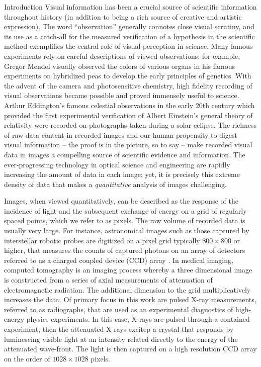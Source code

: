 \setlength{\parindent}{2ex}
\begin{chapter}{Introduction}\label{chapter:introduction}
  Visual information has been a crucial source of scientific information throughout history (in addition to being a rich source of creative and artistic expression).  
  The word ``observation'' generally connotes close visual scrutiny, and its use as a catch-all for the measured verification of a hypothesis in the scientific method exemplifies the central role of visual perception in science.
  Many famous experiments rely on careful descriptions of viewed observations; for example, Gregor Mendel visually observed the colors of various organs in his famous experiments on hybridized peas to develop the early principles of genetics.
  With the advent of the camera and photosensitive chemistry, high fidelity recording of visual observations became possible and proved immensely useful to science.
  Arthur Eddington's famous celestial observations in the early 20th century which provided the first experimental verification of Albert Einstein's general theory of relativity were recorded on photographs taken during a solar eclipse.
  The richness of raw data content in recorded images and our human propensity to digest visual information -- the proof is in the picture, so to say -- make recorded visual data in images a compelling source of scientific evidence and information.
  The ever-progressing technology in optical science and engineering are rapidly increasing the amount of data in each image; yet, it is precisely this extreme density of data that makes a \emph{quantitative} analysis of images challenging.

  Images, when viewed quantitatively, can be described as the response of the incidence of light and the subsequent exchange of energy on a grid of regularly spaced points, which we refer to as pixels.
  The raw volume of recorded data is usually very large.
  For instance, astronomical images such as those captured by interstellar robotic probes are digitized on a pixel grid typically $800 \times 800$ or higher, that measures the counts of captured photons on an array of detectors referred to as a charged coupled device (CCD) array \citep{voyager}.
  In medical imaging, computed tomography is an imaging process whereby a three dimensional image is constructed from a series of axial measurements of attenuation of electromagnetic radiation. 
  The additional dimension to the grid multiplicatively increases the data.
  Of primary focus in this work are pulsed X-ray measurements, referred to as radiographs, that are used as an experimental diagnostics of high-energy physics experiments.  
  In this case, X-rays are pulsed through a contained experiment, then the attenuated X-rays excitep a crystal that responds by luminescing visible light at an intensity related directly to the energy of the attenuated wave-front.  
  The light is then captured on a high resolution CCD array on the order of $1028 \times 1028$ pixels.


\end{chapter}

